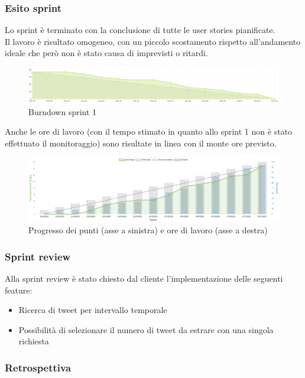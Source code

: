 \subsubsection{Esito sprint}
Lo sprint è terminato con la conclusione di tutte le user stories pianificate.\\
Il lavoro è risultato omogeneo, con un piccolo scostamento rispetto all'andamento ideale 
che però non è stato causa di imprevisti o ritardi.\\
\begin{figure}[H]
    \centering
    \includegraphics[width=15cm]{./img/sprint1/burndown.png}
    \caption{Burndown sprint 1}
\end{figure}
Anche le ore di lavoro (con il tempo stimato in quanto allo sprint 1 non è stato effettuato il monitoraggio) sono risultate in linea con il monte ore previsto.\\
\begin{figure}[H]
    \centering
    \includegraphics[width=15cm]{./img/sprint1/worktime.png}
    \caption{Progresso dei punti (asse a sinistra) e ore di lavoro (asse a destra)}
\end{figure}


\subsubsection{Sprint review}
Alla sprint review è stato chiesto dal cliente l'implementazione delle seguenti feature:
\begin{itemize}
    \item Ricerca di tweet per intervallo temporale
    \item Possibilità di selezionare il numero di tweet da estrare con una singola richiesta
\end{itemize}


\newpage
\subsubsection{Retrospettiva}
